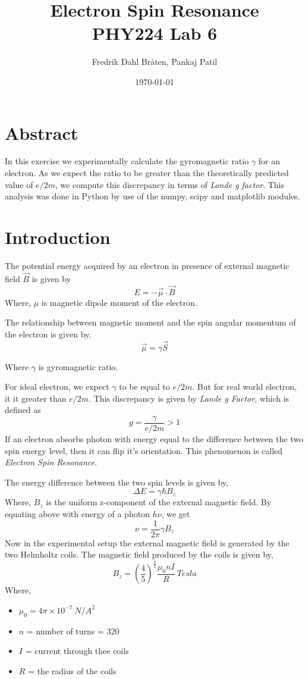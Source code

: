 \documentclass[letterpaper,12pt]{article}
\begin{document}
\title{%
Electron Spin Resonance \\
\large PHY224 Lab 6}
\author{Fredrik Dahl Bråten, Pankaj Patil}
\date{\today}
\maketitle

\section{Abstract}

In this exercise we experimentally calculate the gyromagnetic ratio $\gamma$ for an electron. 
As we expect the ratio to be greater than the theoretically predicted value of $e/2m$, 
we compute this discrepancy in terms of \emph{Lande g factor}. This analysis was done in Python by use of the numpy, scipy and matplotlib modules.

\section{Introduction}

The potential energy acquired by an electron in presence of external magnetic field $\vec{B}$ is given by
$$E = -\vec{\mu} \cdot \vec{B}$$
Where, $\mu$ is magnetic dipole moment of the electron.

The relationship between magnetic moment and the spin angular momentum of the electron is given by,
$$\vec{\mu} = \gamma \vec{S}$$

Where $\gamma$ is gyromagnetic ratio. 

For ideal electron, we expect $\gamma$ to be equal to $e/2m$. But for real world electron, it it greater than $e/2m$.
This discrepancy is given by \emph{Lande g Factor}, which is defined as
$$g = \frac{\gamma}{e/2m} > 1$$
If an electron absorbs photon with energy equal to the difference between the two spin energy level, then 
it can flip it's orientation. This phenomenon is called \emph{Electron Spin Resonance}. 

The energy difference between the two spin levels is given by,
$$\Delta E = \gamma \hbar B_z$$
Where, $B_z$ is the uniform z-component of the external magnetic field. By equating above with energy of a photon $h\nu$, we get
$$\nu = \frac{1}{2\pi}\gamma B_z$$
Now in the experimental setup the external magnetic field is generated by the two Helmholtz coils. The magnetic field produced
by the coils is given by,
$$B_z = \left(\frac{4}{5}\right)^\frac{3}{2} \frac{\mu_0 n I}{R}\ Tesla$$
Where,
\begin{itemize}
  \item[] $\mu_0 = 4\pi \times 10^{-7}\ N/A^2$
  \item[] $n$ = number of turns = 320
  \item[] $I$ = current through thee coils
  \item[] $R$ = the radius of the coils     
\end{itemize}
\end{document}
